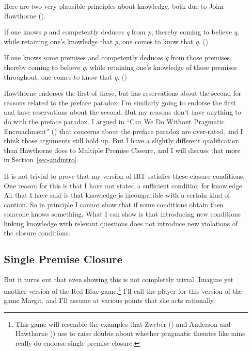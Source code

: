 \documentclass[
  10pt,
  letterpaper,
  twoside]{scrbook}
\providecommand{\tightlist}{%
  \setlength{\itemsep}{0pt}\setlength{\parskip}{0pt}}\usepackage{longtable,booktabs,array}
\begin{document}
Here are two very plausible principles about knowledge, both due to John
Hawthorne ().

\begin{description}
\tightlist
\item[Single Premise Closure]
If one knows \emph{p} and competently deduces \emph{q} from \emph{p},
thereby coming to believe \emph{q}, while retaining one's knowledge that
\emph{p}, one comes to know that \emph{q}.
()
\item[Multiple Premise Closure]
If one knows some premises and competently deduces \emph{q} from those
premises, thereby coming to believe \emph{q}, while retaining one's
knowledge of those premises throughout, one comes to know that \emph{q}.
()
\end{description}

Hawthorne endorses the first of these, but has reservations about the
second for reasons related to the preface paradox. I'm similarly going
to endorse the first and have reservations about the second. But my
reasons don't have anything to do with the preface paradox. I argued in
``Can We Do Without Pragmatic Encroachment''
() that concerns
about the preface paradox are over-rated, and I think those arguments
still hold up. But I have a slightly different qualification than
Hawthorne does to Multiple Premise Closure, and I will discuss that more
in Section~\ref{sec-andintro}.

It is not trivial to prove that my version of IRT satisfies these
closure conditions. One reason for this is that I have not stated a
sufficient condition for knowledge. All that I have said is that
knowledge is incompatible with a certain kind of caution. So in
principle I cannot show that if some conditions obtain then someone
knows something. What I can show is that introducing new conditions
linking knowledge with relevant questions does not introduce new
violations of the closure conditions.

\subsection{Single Premise Closure}\label{sec-andelim}

But it turns out that even showing this is not completely trivial.
Imagine yet another version of the Red-Blue game.\footnote{This game
  will resemble the examples that Zweber
  () and Anderson and Hawthorne
  () use to raise doubts
  about whether pragmatic theories like mine really do endorse single
  premise closure.} I'll call the player for this version of the game
Margit, and I'll assume at various points that she acts rationally.
\end{document}
